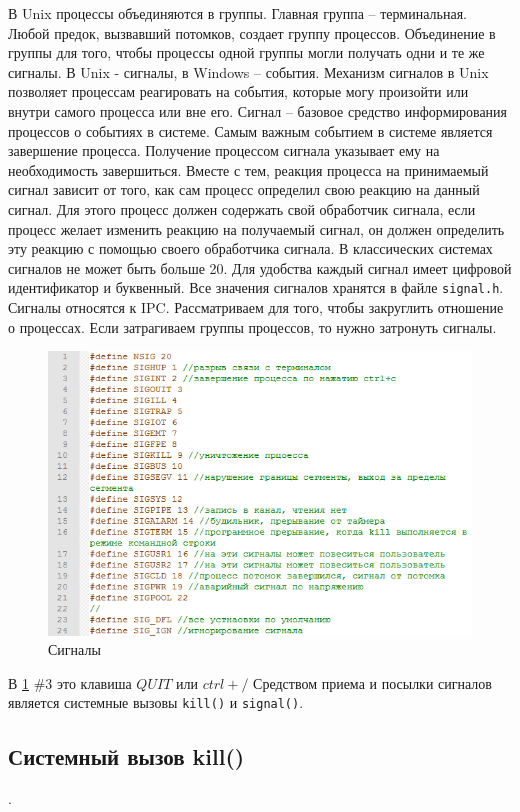 В Unix процессы объединяются в группы. Главная группа – терминальная. Любой предок, вызвавший потомков, создает группу процессов. Объединение в группы для того, чтобы процессы одной группы могли получать одни и те же сигналы.
В Unix - сигналы, в Windows – события. Механизм сигналов в Unix позволяет процессам реагировать на события, которые могу произойти или внутри самого процесса или вне его. Сигнал – базовое средство информирования процессов о событиях в системе.
Самым важным событием в системе является завершение процесса. Получение процессом сигнала указывает ему на необходимость завершиться.  Вместе с тем, реакция процесса на принимаемый сигнал зависит от того, как сам процесс определил свою реакцию на данный сигнал. Для этого процесс должен содержать свой обработчик сигнала, если процесс желает изменить реакцию на получаемый сигнал, он должен определить эту реакцию с помощью своего обработчика сигнала. В классических системах сигналов не может быть больше 20. Для удобства каждый сигнал имеет цифровой идентификатор и буквенный. Все значения сигналов хранятся в файле \verb|signal.h|. 
Сигналы относятся к IPC. Рассматриваем для того, чтобы закруглить отношение о процессах. Если затрагиваем группы процессов, то нужно затронуть сигналы. 

\begin{figure}[H]
	\centering
	\includegraphics[width=\textwidth]{pic/5.png}
	\caption{Сигналы}
	\label{listing:signals}
\end{figure}

В \ref{listing:signals} \#3 это клавиша $QUIT$ или $ctrl + / $
Средством приема и посылки сигналов является системные вызовы \verb|kill()| и \verb|signal()|.

\subsection{Системный вызов kill()}.

